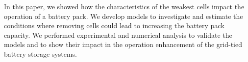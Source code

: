 \documentclass[10pt,twocolumn]{IEEEtran}
\begin{document}
In this paper, we showed how the  characteristics of the weakest cells impact the operation of a battery pack. We develop models to investigate and estimate the conditions where removing cells could lead to increasing the battery pack capacity. We performed experimental and numerical analysis to validate the models and to show their impact in the operation enhancement of the grid-tied battery storage systems.












\vspace{-0.3cm}






\end{document}
